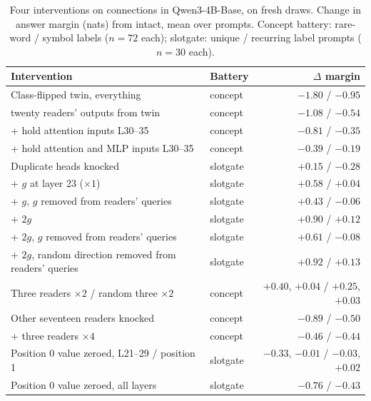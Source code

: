 \documentclass{article}
\begin{document}
\begin{table}[t]
\centering\small
\caption{Four interventions on connections in Qwen3-4B-Base, on fresh draws. Change in answer margin (nats) from intact, mean over prompts. Concept battery: rare-word / symbol labels ($n=72$ each); slotgate: unique / recurring label prompts ($n=30$ each).}\label{tab:arrows}
\begin{tabular}{llr}
\toprule
Intervention & Battery & $\Delta$ margin \\
\midrule
Class-flipped twin, everything & concept & $-1.80$ / $-0.95$ \\
\quad twenty readers' outputs from twin & concept & $-1.08$ / $-0.54$ \\
\quad\quad + hold attention inputs L30--35 & concept & $-0.81$ / $-0.35$ \\
\quad\quad + hold attention and MLP inputs L30--35 & concept & $-0.39$ / $-0.19$ \\
\midrule
Duplicate heads knocked & slotgate & $+0.15$ / $-0.28$ \\
\quad + $g$ at layer 23 ($\times 1$) & slotgate & $+0.58$ / $+0.04$ \\
\quad + $g$, $g$ removed from readers' queries & slotgate & $+0.43$ / $-0.06$ \\
\quad + $2g$ & slotgate & $+0.90$ / $+0.12$ \\
\quad + $2g$, $g$ removed from readers' queries & slotgate & $+0.61$ / $-0.08$ \\
\quad + $2g$, random direction removed from readers' queries & slotgate & $+0.92$ / $+0.13$ \\
\midrule
Three readers $\times 2$ / random three $\times 2$ & concept & $+0.40$, $+0.04$ / $+0.25$, $+0.03$ \\
Other seventeen readers knocked & concept & $-0.89$ / $-0.50$ \\
\quad + three readers $\times 4$ & concept & $-0.46$ / $-0.44$ \\
\midrule
Position 0 value zeroed, L21--29 / position 1 & slotgate & $-0.33$, $-0.01$ / $-0.03$, $+0.02$ \\
Position 0 value zeroed, all layers & slotgate & $-0.76$ / $-0.43$ \\
\bottomrule
\end{tabular}
\end{table}
\end{document}

